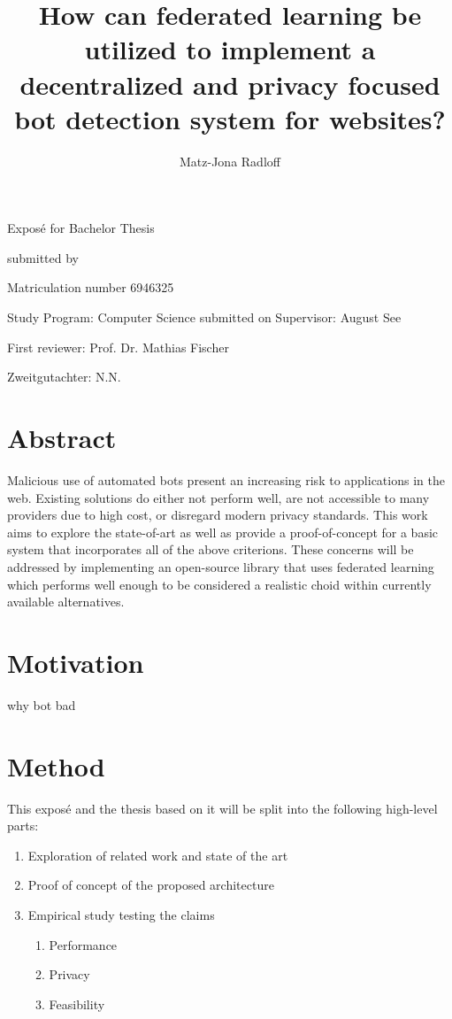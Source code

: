 \documentclass[
    fontsize=12pt,
    headings=small,
    parskip=half,           %
    bibliography=totoc,
    numbers=noenddot,       %
    open=any,               %
    ]{scrreprt}
\title{How can federated learning be utilized to implement a decentralized and privacy focused bot detection system for websites?}
\author{Matz-Jona Radloff}
\begin{document}
\begin{titlepage}
\begin{center}\Large
	\vfill
    Exposé for Bachelor Thesis
	\vfill
	\makeatletter
	{\Large\textsf{\textbf{\@title}}\par}
	\makeatother
	\vfill
    submitted by
	\par\bigskip
	\makeatletter
	{\@author} \par
	\makeatother
	Matriculation number 6946325 \par
	Study Program: Computer Science
	\vfill
	\makeatletter
	submitted on {\@date}
	\makeatother
	\vfill
	Supervisor: August See\par
	First reviewer: Prof. Dr. Mathias Fischer \par
	Zweitgutachter: N.N.
\end{center}
\end{titlepage}


\chapter*{Abstract}

Malicious use of automated bots present an increasing risk to applications in the web. Existing solutions do either not perform well, are not accessible to many providers due to high cost, or disregard modern privacy standards. This work aims to explore the state-of-art as well as provide a proof-of-concept for a basic system that incorporates all of the above criterions. These concerns will be addressed by implementing an open-source library that uses federated learning which performs well enough to be considered a realistic choid within currently available alternatives.

\tableofcontents

\chapter{Motivation}

why bot bad

\chapter{Method}

This exposé and the thesis based on it will be split into the following high-level parts:

\begin{enumerate}
	\item Exploration of related work and state of the art
	\item Proof of concept of the proposed architecture
	\item Empirical study testing the claims
	\begin{enumerate}
		\item Performance
		\item Privacy
		\item Feasibility
	\end{enumerate}
\end{enumerate}
\end{document}
